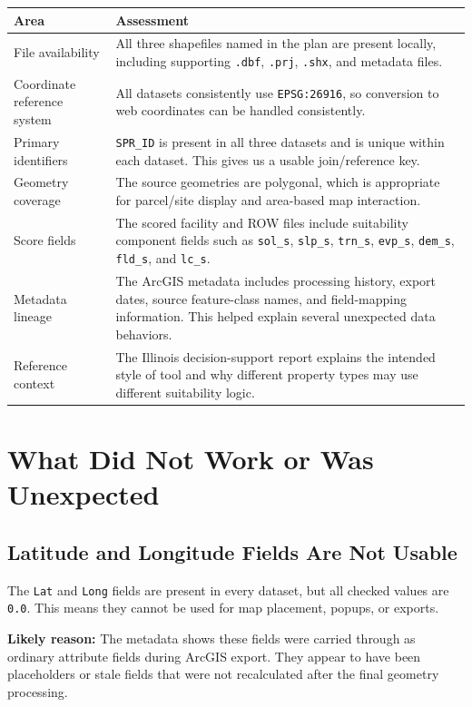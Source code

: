 \documentclass[11pt]{article}
\newcommand{\code}[1]{\nolinkurl{#1}}
\begin{document}
\begin{longtable}{L{0.28\textwidth} L{0.60\textwidth}}
\toprule
\textbf{Area} & \textbf{Assessment} \\
\midrule
\endhead
File availability & All three shapefiles named in the plan are present locally, including supporting \code{.dbf}, \code{.prj}, \code{.shx}, and metadata files. \\
Coordinate reference system & All datasets consistently use \code{EPSG:26916}, so conversion to web coordinates can be handled consistently. \\
Primary identifiers & \code{SPR_ID} is present in all three datasets and is unique within each dataset. This gives us a usable join/reference key. \\
Geometry coverage & The source geometries are polygonal, which is appropriate for parcel/site display and area-based map interaction. \\
Score fields & The scored facility and ROW files include suitability component fields such as \code{sol_s}, \code{slp_s}, \code{trn_s}, \code{evp_s}, \code{dem_s}, \code{fld_s}, and \code{lc_s}. \\
Metadata lineage & The ArcGIS metadata includes processing history, export dates, source feature-class names, and field-mapping information. This helped explain several unexpected data behaviors. \\
Reference context & The Illinois decision-support report explains the intended style of tool and why different property types may use different suitability logic. \\
\bottomrule
\end{longtable}

\section{What Did Not Work or Was Unexpected}

\subsection{Latitude and Longitude Fields Are Not Usable}

The \code{Lat} and \code{Long} fields are present in every dataset, but all checked
values are \code{0.0}. This means they cannot be used for map placement, popups, or
exports.

\textbf{Likely reason:} The metadata shows these fields were carried through as
ordinary attribute fields during ArcGIS export. They appear to have been placeholders
or stale fields that were not recalculated after the final geometry processing.
\end{document}
